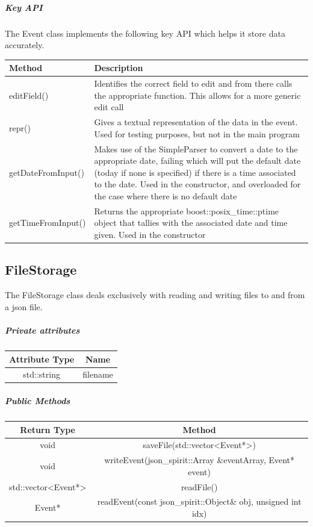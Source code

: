 \documentclass[12pt]{extarticle}
\begin{document}
\subparagraph{Key API}
The Event class implements the following key API which helps it store data accurately.\\
\begin{tabular}{p{6cm} p{12cm}}
Method & Description\\
\hline
editField() & Identifies the correct field to edit and from there calls the appropriate function. This allows for a more generic edit call\\
repr() & Gives a textual representation of the data in the event. Used for testing purposes, but not in the main program\\
getDateFromInput() & Makes use of the SimpleParser to convert a date to the appropriate date, failing which will put the default date (today if none is specified) if there is a time associated to the date. Used in the constructor, and overloaded for the case where there is no default date\\
getTimeFromInput() & Returns the appropriate boost::posix\_time::ptime object that tallies with the associated date and time given. Used in the constructor\\
\end{tabular}

\subsection{FileStorage}
The FileStorage class deals exclusively with reading and writing files to and from a json file.
\subparagraph{Private attributes}
\begin{tabular}{c c}
Attribute Type & Name\\
\hline
std::string & filename\\
\end{tabular}

\subparagraph{Public Methods}
\begin{tabular}{c c}
Return Type & Method\\
\hline
void & saveFile(std::vector<Event*>)\\
void & writeEvent(json\_spirit::Array \&eventArray, Event* event)\\
std::vector<Event*> & readFile()\\
Event* & readEvent(const json\_spirit::Object\& obj, unsigned int idx)\\
\end{tabular}
\end{document}
